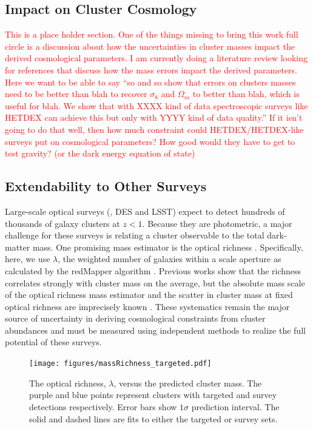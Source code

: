 \documentclass[fleqn,usenatbib]{mnras}
\newcommand{\editorial}[1]{\textcolor{red}{#1}}
\begin{document}
\subsection{Impact on Cluster Cosmology}
\editorial{This is a place holder section. One of the things missing to bring this work full circle is a discussion about how the uncertainties in cluster masses impact the derived cosmological parameters. I am currently doing a literature review looking for references that discuss how the mass errors impact the derived parameters. Here we want to be able to say ``so and so show that errors on clusters masses need to be better than blah to recover $\sigma_8$ and $\Omega_m$ to better than blah, which is useful for blah. We show that with XXXX kind of data spectroscopic surveys like HETDEX can achieve this but only with YYYY kind of data quality.'' If it isn't going to do that well, then how much constraint could HETDEX/HETDEX-like surveys put on cosmological parameters? How good would they have to get to test gravity? (or the dark energy equation of state)}


\subsection{Extendability to Other Surveys}
Large-scale optical surveys (\eg, DES and LSST) expect to detect hundreds of thousands of galaxy clusters at $z < 1$. Because they are photometric, a major challenge for these surveys is relating a cluster observable to the total dark-matter mass. One promising mass estimator is the optical richness . Specifically, here, we use $\lambda$, the weighted number of galaxies within a scale aperture  as calculated by the redMapper algorithm \citep{Rykoff2012}. Previous works  show that the richness correlates strongly with cluster mass on the average, but the absolute mass scale of the optical richness mass estimator and the scatter in cluster mass at fixed optical richness are imprecisely known \citep{Rykoff2012}. These systematics remain the major source of uncertainty in deriving cosmological constraints from cluster abundances and must be measured using independent methods to realize the full potential of these surveys.

\begin{figure} 
	\texttt{[image: figures/massRichness\_targeted.pdf]} 
	\caption{The optical richness, $\lambda$, versus the predicted cluster mass. The purple and blue points represent clusters with targeted and survey detections respectively. Error bars show $1\sigma$ prediction interval. The solid and dashed lines are fits to either the targeted or survey sets. } \label{fig:mass richness} 
\end{figure}
\end{document}
